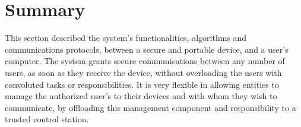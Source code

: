 


\section*{Summary}\label{chap:arch:summary}

This section described the system's functionalities, algorithms and communications protocols, between a secure and portable device, and a user's computer.
The system grants secure communications between any number of users, as soon as they receive the device, without overloading the users with convoluted tasks or responsibilities.
It is very flexible in allowing entities to manage the authorized user's to their devices and with whom they wish to communicate, by offloading this management component and responsibility to a trusted control station.
